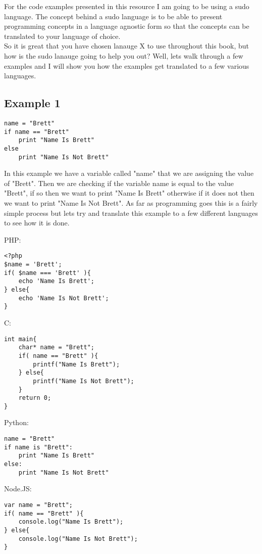 For the code examples presented in this resource I am going to be using a sudo language. The concept behind a sudo language
is to be able to present programming concepts in a language agnostic form so that the concepts can be translated to your
language of choice.
\newline
\\
So it is great that you have chosen lanauge X to use throughout this book, but how is the sudo lanauge going to help you out?
Well, lets walk through a few examples and I will show you how the examples get translated to a few various languages.

\subsection{Example 1}
\begin{lstlisting}
name = "Brett"
if name == "Brett"
    print "Name Is Brett"
else
    print "Name Is Not Brett"
\end{lstlisting}

In this example we have a variable called "name" that we are assigning the value of "Brett". Then we are checking if the
variable name is equal to the value "Brett", if so then we want to print "Name Is Brett" otherwise if it does not then we want to 
print "Name Is Not Brett". As far as programming goes this is a fairly simple process but lets try and translate this example
to a few different languages to see how it is done.

PHP:
\begin{lstlisting}
<?php
$name = 'Brett';
if( $name === 'Brett' ){
    echo 'Name Is Brett';
} else{
    echo 'Name Is Not Brett';
}
\end{lstlisting}

C:
\begin{lstlisting}
int main{
    char* name = "Brett";
    if( name == "Brett" ){
        printf("Name Is Brett");
    } else{
        printf("Name Is Not Brett");
    }
    return 0;
}
\end{lstlisting}

Python:
\begin{lstlisting}
name = "Brett"
if name is "Brett":
    print "Name Is Brett"
else:
    print "Name Is Not Brett"
\end{lstlisting}

Node.JS:
\begin{lstlisting}
var name = "Brett";
if( name == "Brett" ){
    console.log("Name Is Brett");
} else{
    console.log("Name Is Not Brett");
}
\end{lstlisting}

